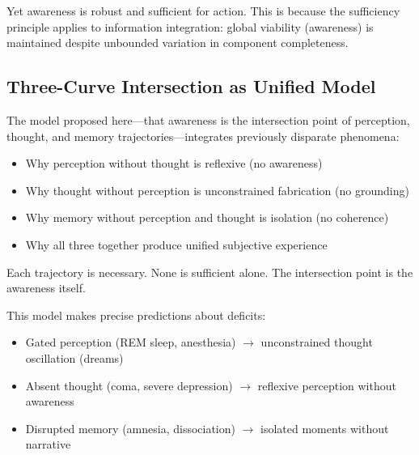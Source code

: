 \documentclass[twocolumn,11pt,a4paper]{article}
\begin{document}
Yet awareness is robust and sufficient for action. This is because the sufficiency principle applies to information integration: global viability (awareness) is maintained despite unbounded variation in component completeness.

\subsection{Three-Curve Intersection as Unified Model}

The model proposed here—that awareness is the intersection point of perception, thought, and memory trajectories—integrates previously disparate phenomena:

\begin{itemize}
\item Why perception without thought is reflexive (no awareness)
\item Why thought without perception is unconstrained fabrication (no grounding)
\item Why memory without perception and thought is isolation (no coherence)
\item Why all three together produce unified subjective experience
\end{itemize}

Each trajectory is necessary. None is sufficient alone. The intersection point is the awareness itself.

This model makes precise predictions about deficits:
\begin{itemize}
\item Gated perception (REM sleep, anesthesia) $\to$ unconstrained thought oscillation (dreams)
\item Absent thought (coma, severe depression) $\to$ reflexive perception without awareness
\item Disrupted memory (amnesia, dissociation) $\to$ isolated moments without narrative
\end{itemize}
\end{document}
